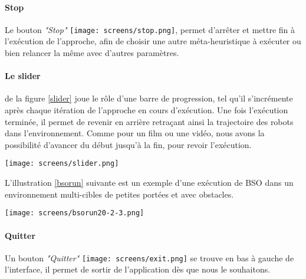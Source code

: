 	
	\paragraph{Stop}
	Le bouton \textit{"Stop"}	\texttt{[image: screens/stop.png]}, permet d'arrêter et mettre fin à l'exécution de l'approche, afin de choisir une autre méta-heuristique à exécuter ou bien relancer la même avec d'autres paramètres.
	
	
	\paragraph{Le slider} de la figure \ref{slider} joue le rôle d'une barre de progression, tel qu'il s'incrémente après chaque itération de l'approche en cours d'exécution. Une fois l'exécution terminée, il permet de revenir en arrière retraçant ainsi la trajectoire des robots dans l'environnement. Comme pour un film ou une vidéo, nous avons la possibilité d'avancer du début jusqu'à la fin, pour revoir l'exécution.
	\begin{center}	  
		\captionsetup{width=1\linewidth}
		\texttt{[image: screens/slider.png]}%
		\vspace{-0.3 cm}
		\label{slider}%
	\end{center}
	
	L'illustration \ref{bsorun} suivante est un exemple d'une exécution de BSO dans un environnement multi-cibles de petites portées et avec obstacles.
	\begin{center}	  
		\captionsetup{width=1\linewidth}
		\texttt{[image: screens/bsorun20-2-3.png]}%
		\vspace{-0.3 cm}
		\label{bsorun}%
	\end{center}
	
	
	\paragraph{Quitter}
	Un bouton \textit{"Quitter"} \texttt{[image: screens/exit.png]} se trouve en bas à gauche de l'interface, il permet de sortir de l'application dès que nous le souhaitons.
	
	
	
